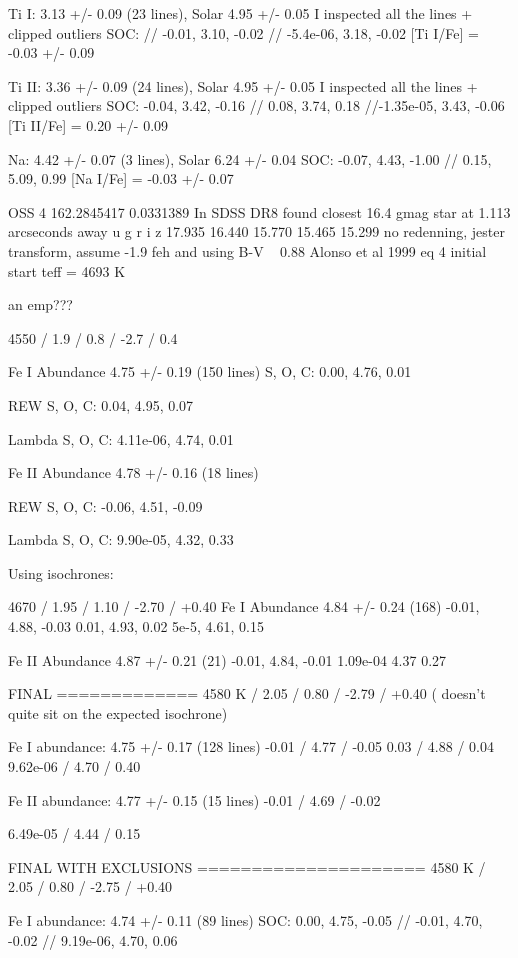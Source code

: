 \documentclass{emulateapj}
\begin{document}
Ti I: 3.13 +/- 0.09 (23 lines), Solar 4.95 +/- 0.05
I inspected all the lines + clipped outliers
SOC: // -0.01, 3.10, -0.02 // -5.4e-06, 3.18, -0.02
[Ti I/Fe] = -0.03 +/- 0.09

Ti II: 3.36 +/- 0.09 (24 lines), Solar 4.95 +/- 0.05
I inspected all the lines + clipped outliers
SOC: -0.04, 3.42, -0.16 // 0.08, 3.74, 0.18 //-1.35e-05, 3.43, -0.06
[Ti II/Fe] = 0.20 +/- 0.09

Na: 4.42 +/- 0.07 (3 lines), Solar 6.24 +/- 0.04
SOC: -0.07, 4.43, -1.00 // 0.15, 5.09, 0.99
[Na I/Fe] = -0.03 +/- 0.07




OSS 4
162.2845417 0.0331389
In SDSS DR8 found closest 16.4 gmag star at 1.113 arcseconds away
u g r i z
17.935 16.440 15.770 15.465 15.299
no redenning, jester transform, assume -1.9 feh and using B-V ~ 0.88
Alonso et al 1999 eq 4
initial start teff = 4693 K

an emp???

4550 /  1.9 / 0.8 / -2.7 / 0.4

Fe I Abundance 4.75 +/- 0.19 (150 lines)
S, O, C: 0.00, 4.76, 0.01

REW S, O, C: 0.04, 4.95, 0.07

Lambda S, O, C: 4.11e-06, 4.74, 0.01

Fe II Abundance 4.78 +/- 0.16 (18 lines)

REW S, O, C: -0.06, 4.51, -0.09

Lambda S, O, C: 9.90e-05, 4.32, 0.33

Using isochrones:

4670 / 1.95 / 1.10 / -2.70 / +0.40
Fe I Abundance 4.84 +/- 0.24 (168)
-0.01, 4.88, -0.03
0.01, 4.93, 0.02
5e-5, 4.61, 0.15

Fe II Abundance 4.87 +/- 0.21 (21)
-0.01, 4.84, -0.01
1.09e-04 4.37 0.27

FINAL
=============
4580 K / 2.05 / 0.80 / -2.79 / +0.40
( doesn't quite sit on the expected isochrone)

Fe I abundance: 4.75 +/- 0.17 (128 lines)
-0.01 / 4.77 / -0.05
0.03 / 4.88 / 0.04
9.62e-06 / 4.70 / 0.40

Fe II abundance: 4.77 +/- 0.15 (15 lines)
-0.01 / 4.69 / -0.02

6.49e-05 / 4.44 / 0.15

FINAL WITH EXCLUSIONS
=====================
4580 K / 2.05 / 0.80 / -2.75 / +0.40

Fe I abundance: 4.74 +/- 0.11 (89 lines)
SOC: 0.00, 4.75, -0.05 // -0.01, 4.70, -0.02 // 9.19e-06, 4.70, 0.06
\end{document}
